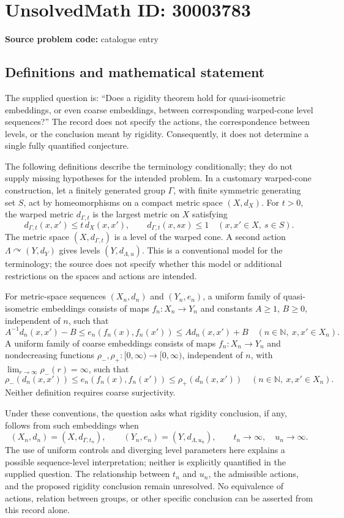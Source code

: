 \documentclass[11pt]{article}
\newcommand{\N}{\mathbb{N}}
\begin{document}
\section*{UnsolvedMath ID: 30003783}
\textbf{Source problem code:} catalogue entry
\subsection{Definitions and mathematical statement}
The supplied question is: ``Does a rigidity theorem hold for quasi-isometric embeddings, or even coarse embeddings, between corresponding warped-cone level sequences?'' The record does not specify the actions, the correspondence between levels, or the conclusion meant by rigidity. Consequently, it does not determine a single fully quantified conjecture.

The following definitions describe the terminology conditionally; they do not supply missing hypotheses for the intended problem. In a customary warped-cone construction, let a finitely generated group \(\Gamma\), with finite symmetric generating set \(S\), act by homeomorphisms on a compact metric space \((X,d_X)\). For \(t>0\), the warped metric \(d_{\Gamma,t}\) is the largest metric on \(X\) satisfying
\[
 d_{\Gamma,t}(x,x')\leq t\,d_X(x,x'),\qquad
 d_{\Gamma,t}(x,sx)\leq 1
 \quad(x,x'\in X,\ s\in S).
\]
The metric space \((X,d_{\Gamma,t})\) is a level of the warped cone. A second action \(\Lambda\curvearrowright(Y,d_Y)\) gives levels \((Y,d_{\Lambda,u})\). This is a conventional model for the terminology; the source does not specify whether this model or additional restrictions on the spaces and actions are intended.

For metric-space sequences \((X_n,d_n)\) and \((Y_n,e_n)\), a uniform family of quasi-isometric embeddings consists of maps \(f_n:X_n\to Y_n\) and constants \(A\geq1\), \(B\geq0\), independent of \(n\), such that
\[
 A^{-1}d_n(x,x')-B
 \leq e_n(f_n(x),f_n(x'))
 \leq A d_n(x,x')+B
 \quad(n\in\N,\ x,x'\in X_n).
\]
A uniform family of coarse embeddings consists of maps \(f_n:X_n\to Y_n\) and nondecreasing functions \(\rho_-,\rho_+:[0,\infty)\to[0,\infty)\), independent of \(n\), with \(\lim_{r\to\infty}\rho_-(r)=\infty\), such that
\[
 \rho_-(d_n(x,x'))
 \leq e_n(f_n(x),f_n(x'))
 \leq \rho_+(d_n(x,x'))
 \quad(n\in\N,\ x,x'\in X_n).
\]
Neither definition requires coarse surjectivity.

Under these conventions, the question asks what rigidity conclusion, if any, follows from such embeddings when
\[
 (X_n,d_n)=(X,d_{\Gamma,t_n}),\qquad
 (Y_n,e_n)=(Y,d_{\Lambda,u_n}),\qquad
 t_n\to\infty,\quad u_n\to\infty.
\]
The use of uniform controls and diverging level parameters here explains a possible sequence-level interpretation; neither is explicitly quantified in the supplied question. The relationship between \(t_n\) and \(u_n\), the admissible actions, and the proposed rigidity conclusion remain unresolved. No equivalence of actions, relation between groups, or other specific conclusion can be asserted from this record alone.
\end{document}
